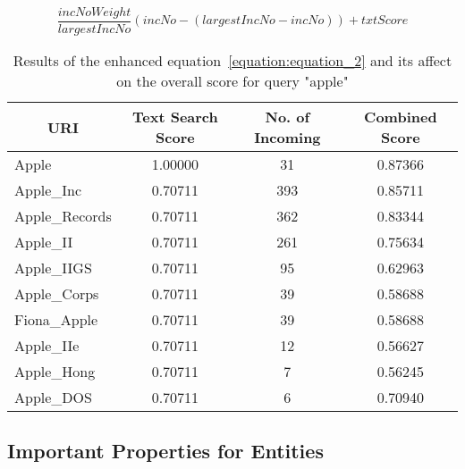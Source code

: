 \begin{equation}\label{equation:equation_2}
\frac{incNoWeight}{largestIncNo} \left ( incNo - \left ( largestIncNo - incNo \right ) \right )  + txtScore
\end{equation}

\begin{table}
\centering
\begin{tabular}{|l|c|c|c|}
\hline
\multicolumn{1}{|c|}{{\bf URI}} & {\bf Text Search Score} & {\bf No. of Incoming} & {\bf Combined Score} \\ \hline
Apple                           & 1.00000                 & 31                    & 0.87366              \\ \hline
Apple\_Inc                      & 0.70711                 & 393                   & 0.85711              \\ \hline
Apple\_Records                  & 0.70711                 & 362                   & 0.83344              \\ \hline
Apple\_II                       & 0.70711                 & 261                   & 0.75634              \\ \hline
Apple\_IIGS                     & 0.70711                 & 95                    & 0.62963              \\ \hline
Apple\_Corps                    & 0.70711                 & 39                    & 0.58688              \\ \hline
Fiona\_Apple                    & 0.70711                 & 39                    & 0.58688              \\ \hline
Apple\_IIe                      & 0.70711                 & 12                    & 0.56627              \\ \hline
Apple\_Hong                     & 0.70711                 & 7                     & 0.56245              \\ \hline
Apple\_DOS                      & 0.70711                 & 6                     & 0.70940              \\ \hline
\end{tabular}
\caption{Results of the enhanced equation~\ref{equation:equation_2} and its affect on the overall score for query "apple"}
\label{tab:text_search_combined_incoming_associations_enhanced}
\end{table}

\subsection{Important Properties for Entities}

